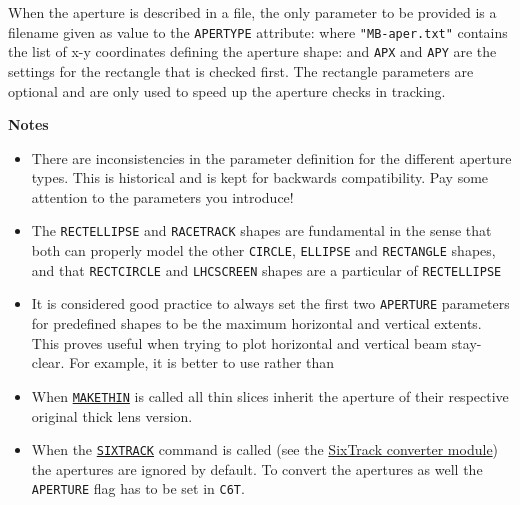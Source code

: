 When the aperture is described in a file, the only parameter to be provided is 
a filename given as value to the \texttt{APERTYPE} attribute:
where \texttt{"MB-aper.txt"} contains the list of x-y coordinates defining the
aperture shape:
and \texttt{APX} and \texttt{APY} are the settings for the rectangle 
that is checked first. The rectangle parameters are optional and are 
only used to speed up the aperture checks in tracking.

\textbf{Notes}
\begin{itemize}
   \item There are inconsistencies in the parameter definition for the
     different aperture types. This is historical and is kept for
     backwards compatibility. Pay some attention to the parameters you
     introduce! 


	\item The \texttt{RECTELLIPSE}  and \texttt{RACETRACK} shapes are fundamental 
	in the sense that both can properly model the other \texttt{CIRCLE}, 
	\texttt{ELLIPSE} and \texttt{RECTANGLE} shapes, and that \texttt{RECTCIRCLE} 
	and \texttt{LHCSCREEN} shapes are a particular of \texttt{RECTELLIPSE}

	\item It is considered good practice to always set the first two 
	\texttt{APERTURE} parameters for predefined shapes to be the maximum
	horizontal and vertical extents. This proves useful when trying to 
	plot horizontal and vertical beam stay-clear. 
	For example, it is better to use
	rather than

   \item When \hyperref[chap:makethin]{\texttt{MAKETHIN}} is called all
     thin slices inherit the aperture of their respective original thick
     lens version.  

   \item When the \hyperref[chap:sixtrack]{\texttt{SIXTRACK}} command is called (see the
     \hyperref[chap:sixtrack]{SixTrack converter module}) the apertures are
     ignored by default. To convert the apertures as well the \texttt{APERTURE}
     flag has to be set in \texttt{C6T}.  


\end{itemize}
